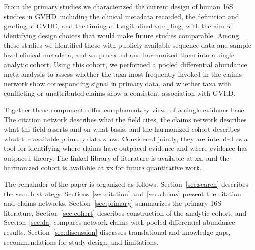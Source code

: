 \documentclass[11pt,a4paper]{article}
\newcommand{\choice}[1]{\par\noindent\textcolor{magenta!80!black}{\small\textbf{[Outline choice]} #1}\par}
\newcommand{\figbox}[2]{%
  \fbox{\parbox[c][#1][c]{\dimexpr\linewidth-2\fboxsep-2\fboxrule}{\centering\small\textit{#2}}}}
\begin{document}
From the primary studies we characterized the current design of human 16S studies in GVHD, including the clinical metadata recorded, the definition and grading of GVHD, and the timing of longitudinal sampling, with the aim of identifying design choices that would make future studies comparable. Among these studies we identified those with publicly available sequence data and sample level clinical metadata, and we processed and harmonized them into a single analytic cohort. Using this cohort, we performed a pooled differential abundance meta-analysis to assess whether the taxa most frequently invoked in the claims network show corresponding signal in primary data, and whether taxa with conflicting or unattributed claims show a consistent association with GVHD.

Together these components offer complementary views of a single evidence base. The citation network describes what the field cites, the claims network describes what the field asserts and on what basis, and the harmonized cohort describes what the available primary data show. Considered jointly, they are intended as a tool for identifying where claims have outpaced evidence and where evidence has outpaced theory. The linked library of literature is available at xx, and the harmonized cohort is available at xx for future quantitative work.

The remainder of the paper is organized as follows. Section~\ref{sec:search} describes the search strategy. Sections~\ref{sec:citation} and~\ref{sec:claims} present the citation and claims networks. Section~\ref{sec:primary} summarizes the primary 16S literature, Section~\ref{sec:cohort} describes construction of the analytic cohort, and Section~\ref{sec:da} compares network claims with pooled differential abundance results. Section~\ref{sec:discussion} discusses translational and knowledge gaps, recommendations for study design, and limitations.

\end{document}
